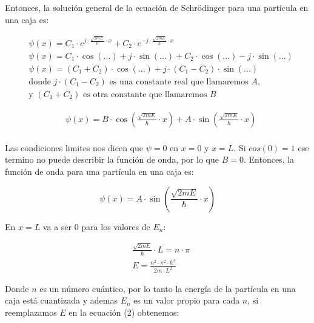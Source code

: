 \documentclass[a4paper]{article}
\begin{document}
        \indent Entonces, la solución general de la ecuación de Schrödinger para una partícula en una caja es:

        \begin{align*}
            &\psi(x) =  C_1 \cdot e^{j \cdot \frac{\sqrt{2mE}}{\hbar} \cdot x} + C_2 \cdot e^{-j \cdot \frac{\sqrt{2mE}}{\hbar} \cdot x} \\
            &\psi(x) =  C_1 \cdot \cos(...) + j \cdot \sin(...) + C_2 \cdot\cos(...) - j \cdot \sin(...) \\
            &\psi(x) =  (C_1 + C_2) \cdot \cos(...) + j \cdot (C_1 - C_2) \cdot \sin(...) \\
            &\text{donde } j \cdot (C_1 - C_2) \text{ es una constante real que llamaremos } A, \\
            &\text{y } (C_1 + C_2) \text{ es otra constante que llamaremos } B
        \end{align*}

        \saltoPag
        \vspace{-10mm}

        \begin{align*}
            &\psi(x) = B \cdot \cos(\frac{\sqrt{2mE}}{\hbar} \cdot x) + A \cdot \sin(\frac{\sqrt{2mE}}{\hbar} \cdot x) \\
        \end{align*}
        \vspace{-5mm}

        \indent Las condiciones limites nos dicen que $\psi = 0$ en $x = 0$ y $x = L$. Si $cos (0) = 1$ ese termino no puede describir la función de onda, por lo que $B = 0$. Entonces, la función de onda para una partícula en una caja es:

        \begin{equation}
            \psi(x) = A \cdot \sin(\frac{\sqrt{2mE}}{\hbar} \cdot x)
        \end{equation}

        \indent En $x = L$ va a ser 0 para los valores de $E_n$:
        \vspace{-1mm}

        \begin{align*}
            &\frac{\sqrt{2mE}}{\hbar} \cdot L = n \cdot \pi \\
            &E = \frac{n^2 \cdot \pi^2 \cdot \hbar^2}{2m \cdot L^2}
        \end{align*}

        \indent Donde $n$ es un número cuántico, por lo tanto la energía de la partícula en una caja está cuantizada y ademas $E_n$ es un valor propio para cada $n$, si reemplazamos $E$ en la ecuación (2) obtenemos:
\end{document}
